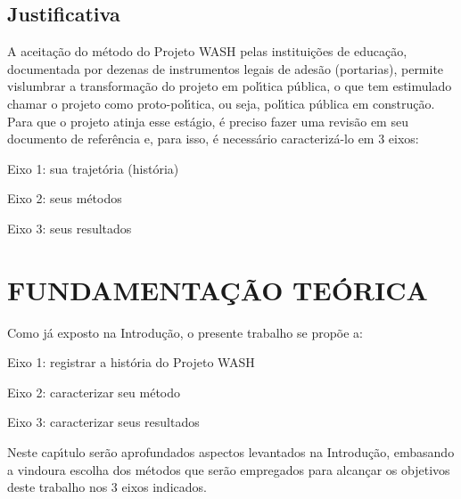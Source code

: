 \documentclass[
12pt,		%
openright,	%
twoside,  %
a4paper,			%
chapter=TITLE,		%
english,			%
french,				%
spanish,			%
brazil				%
]{USPSC-classe/USPSC}
\begin{document}
\section[Justificativa]{Justificativa}\label{Justificativa}
A aceita\c{c}\~ao do m\'etodo do Projeto WASH pelas institui\c{c}\~oes de educa\c{c}\~ao, documentada por dezenas de instrumentos legais de ades\~ao (portarias), permite vislumbrar a transforma\c{c}\~ao do projeto em pol\'{\i}tica p\'ublica, o que tem estimulado chamar o projeto como \textquotedbl proto-pol\'{\i}tica\textquotedbl , ou seja, pol\'{\i}tica p\'ublica em constru\c{c}\~ao. Para que o projeto atinja esse est\'agio, \'e preciso fazer uma revis\~ao em seu documento de refer\^encia e, para isso, \'e necess\'ario caracteriz\'a-lo em 3 eixos:











\begin{alineas}
\item Eixo 1: sua trajet\'oria (hist\'oria)
\item Eixo 2: seus m\'etodos
\item Eixo 3: seus resultados
\end{alineas}

\chapter[FUNDAMENTA\c{C}\~AO TE\'ORICA ]{FUNDAMENTA\c{C}\~AO TE\'ORICA }\label{FUNDAMENTA\c{C}\~AO TE\'ORICA }
Como j\'a exposto na \textquotedbl Introdu\c{c}\~ao\textquotedbl , o presente trabalho se prop\~oe a:











\begin{alineas}
\item Eixo 1: registrar a hist\'oria do Projeto WASH
\item Eixo 2: caracterizar seu m\'etodo
\item Eixo 3: caracterizar seus resultados
\end{alineas}

Neste cap\'{\i}tulo ser\~ao aprofundados aspectos levantados na Introdu\c{c}\~ao, embasando a vindoura escolha dos m\'etodos que ser\~ao empregados para alcan\c{c}ar os objetivos deste trabalho nos 3 eixos indicados.
\end{document}

